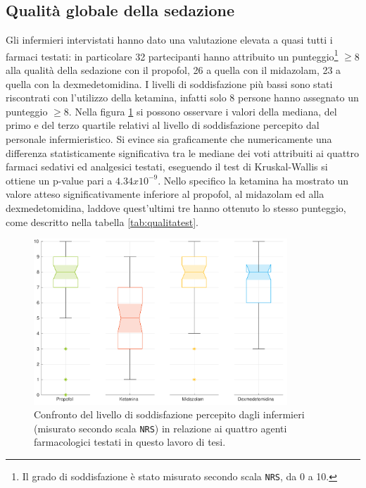 \subsection*{Qualità globale della sedazione}
Gli infermieri intervistati hanno dato una valutazione elevata a quasi tutti i farmaci testati: in particolare 32 partecipanti hanno attribuito un punteggio\footnote{Il grado di soddisfazione è stato misurato secondo scala \texttt{NRS}, da 0 a 10.} $\geq$8 alla qualità della sedazione con il propofol, 26 a quella con il midazolam, 23 a quella con la dexmedetomidina. I livelli di soddisfazione più bassi sono stati riscontrati con l'utilizzo della ketamina, infatti solo 8 persone hanno assegnato un punteggio $\geq$8. Nella figura \ref{fig:qualitascolorful} si possono osservare i valori della mediana, del primo e del terzo quartile relativi al livello di soddisfazione percepito dal personale infermieristico. Si evince sia graficamente che numericamente una differenza statisticamente significativa tra le mediane dei voti attribuiti ai quattro farmaci sedativi ed analgesici testati, eseguendo il test di Kruskal-Wallis si ottiene un p-value pari a $4.34x10^{-9}$. Nello specifico la ketamina ha mostrato un valore atteso significativamente inferiore al propofol, al midazolam ed alla dexmedetomidina, laddove quest'ultimi tre hanno ottenuto lo stesso punteggio, come descritto nella tabella \ref{tab:qualitatest}.

\begin{figure}[h]
    \centering
    \includegraphics[width=0.85\textwidth]{Figure/qualita-colorful.pdf}
    \caption{Confronto del livello di soddisfazione percepito dagli infermieri (misurato secondo scala \texttt{NRS}) in relazione ai quattro agenti farmacologici testati in questo lavoro di tesi.}
    \label{fig:qualitascolorful}
\end{figure}

